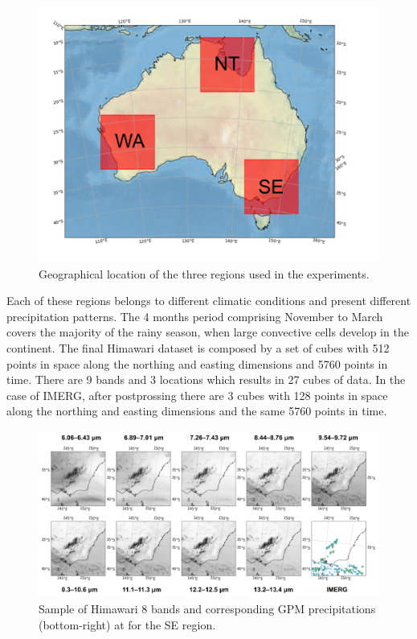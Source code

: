 \documentclass[3p,times]{elsarticle}
\begin{document}
\begin{figure}%
    \includegraphics[width=12cm]{regions.png}
    \caption{Geographical location of the three regions used in the experiments.}%
    \label{regions}%
\end{figure}

Each of these regions belongs to different climatic conditions and present different precipitation patterns. The 4 months period comprising November to March covers the majority of the rainy season, when large convective cells develop in the continent. The final Himawari dataset is composed by a set of cubes with 512 points in space along the northing and easting dimensions and 5760 points in time. There are 9 bands and 3 locations which results in 27 cubes of data. In the case of IMERG, after postprossing there are 3 cubes with 128 points in space along the northing and easting dimensions and the same 5760 points in time.

\begin{figure}%
    \includegraphics[width=14cm]{dataset.png}
    \caption{Sample of Himawari 8 bands and corresponding GPM precipitations (bottom-right) at for the SE region.}%
    \label{dataset}%
\end{figure}
\end{document}
